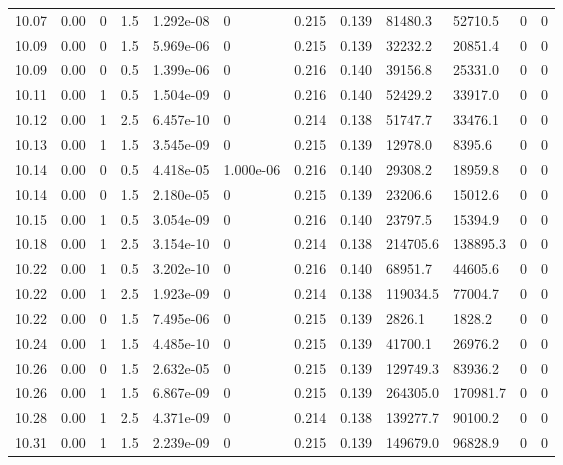 \documentclass[preview]{standalone}
\begin{document}
{{{{{{{{{{{{{{{{{{\begin{tabular}{L{1.2cm}C{1.2cm} C{0.3cm}C{0.5cm} C{1.4cm}C{1.4cm} C{1.4cm}C{1.4cm} C{1.6cm}C{1.6cm} C{1.6cm}C{1.6cm}}
  10.07  &  0.00  & 0     & 1.5 &  1.292e-08  & 0  &  0.215&   0.139& 81480.3 & 52710.5   &  0 & 0  \\ 
  10.09  &  0.00  & 0     & 1.5 &  5.969e-06  & 0  &  0.215&   0.139& 32232.2 & 20851.4   &  0 & 0  \\ 
  10.09  &  0.00  & 0     & 0.5 &  1.399e-06  & 0  &  0.216&   0.140& 39156.8 & 25331.0   &  0 & 0  \\ 
  10.11  &  0.00  & 1     & 0.5 &  1.504e-09  & 0  &  0.216&   0.140& 52429.2 & 33917.0   &  0 & 0  \\ 
  10.12  &  0.00  & 1     & 2.5 &  6.457e-10  & 0  &  0.214&   0.138& 51747.7 & 33476.1   &  0 & 0  \\ 
  10.13  &  0.00  & 1     & 1.5 &  3.545e-09  & 0  &  0.215&   0.139& 12978.0 & 8395.6   &  0 & 0  \\ 
  10.14  &  0.00  & 0     & 0.5 &  4.418e-05  & 1.000e-06  &  0.216&   0.140& 29308.2 & 18959.8   &  0 & 0  \\ 
  10.14  &  0.00  & 0     & 1.5 &  2.180e-05  & 0  &  0.215&   0.139& 23206.6 & 15012.6   &  0 & 0  \\ 
  10.15  &  0.00  & 1     & 0.5 &  3.054e-09  & 0  &  0.216&   0.140& 23797.5 & 15394.9   &  0 & 0  \\ 
  10.18  &  0.00  & 1     & 2.5 &  3.154e-10  & 0  &  0.214&   0.138& 214705.6 & 138895.3   &  0 & 0  \\ 
  10.22  &  0.00  & 1     & 0.5 &  3.202e-10  & 0  &  0.216&   0.140& 68951.7 & 44605.6   &  0 & 0  \\ 
  10.22  &  0.00  & 1     & 2.5 &  1.923e-09  & 0  &  0.214&   0.138& 119034.5 & 77004.7   &  0 & 0  \\ 
  10.22  &  0.00  & 0     & 1.5 &  7.495e-06  & 0  &  0.215&   0.139& 2826.1 & 1828.2   &  0 & 0  \\ 
  10.24  &  0.00  & 1     & 1.5 &  4.485e-10  & 0  &  0.215&   0.139& 41700.1 & 26976.2   &  0 & 0  \\ 
  10.26  &  0.00  & 0     & 1.5 &  2.632e-05  & 0  &  0.215&   0.139& 129749.3 & 83936.2   &  0 & 0  \\ 
  10.26  &  0.00  & 1     & 1.5 &  6.867e-09  & 0  &  0.215&   0.139& 264305.0 & 170981.7   &  0 & 0  \\ 
  10.28  &  0.00  & 1     & 2.5 &  4.371e-09  & 0  &  0.214&   0.138& 139277.7 & 90100.2   &  0 & 0  \\ 
  10.31  &  0.00  & 1     & 1.5 &  2.239e-09  & 0  &  0.215&   0.139& 149679.0 & 96828.9   &  0 & 0  \\ 

\end{tabular}}}}}}}}}}}}}}}}}}}
\end{document}
